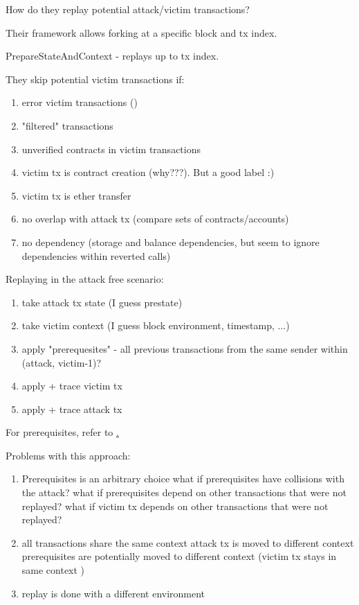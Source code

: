 \documentclass[draft,final]{vutinfth} %
\begin{document}
How do they replay potential attack/victim transactions?

Their framework allows forking at a specific block and tx index.

PrepareStateAndContext - replays up to tx index.


They skip potential victim transactions if:

\begin{enumerate}
    \item error victim transactions ()
    \item "filtered" transactions 
    \item unverified contracts in victim transactions
    \item victim tx is contract creation (why???). But a good label :)
    \item victim tx is ether transfer
    \item no overlap with attack tx (compare sets of contracts/accounts)
    \item no dependency (storage and balance dependencies, but seem to ignore dependencies within reverted calls)
\end{enumerate}

Replaying in the attack free scenario:

\begin{enumerate}
    \item take attack tx state (I guess prestate)
    \item take victim context (I guess block environment, timestamp, ...)
    \item apply "prerequesites" - all previous transactions from the same sender within (attack, victim-1)?
    \item apply + trace victim tx
    \item apply + trace attack tx
\end{enumerate}

For prerequisites, refer to \href{https://github.com/Troublor/erebus-redgiant/blob/4544163f0c6a369b35c3237851f482d240fa7bbd/dataset/tx_history_test.go#L42-L53}.

Problems with this approach:

\begin{enumerate}
    \item Prerequisites is an arbitrary choice
          \subitem what if prerequisites have collisions with the attack?
          \subitem what if prerequisites depend on other transactions that were not replayed?
          \subitem what if victim tx depends on other transactions that were not replayed?
    \item all transactions share the same context
          \subitem attack tx is moved to different context
          \subitem prerequisites are potentially moved to different context
          \subitem (victim tx stays in same context \checkmark)
    \item replay is done with a different environment
\end{enumerate}
\fi
\end{document}
